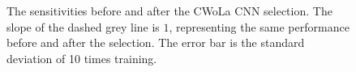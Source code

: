 \documentclass[12pt]{article}
\begin{document}
		\begin{figure}[htpb]
			\centering
			\caption{The sensitivities before and after the CWoLa CNN selection. The slope of the dashed grey line is $1$, representing the same performance before and after the selection. The error bar is the standard deviation of 10 times training.}
			\label{fig:sensitivity_improvement_pt_jet_aug_3_ZN}
		\end{figure}



		
\end{document}
